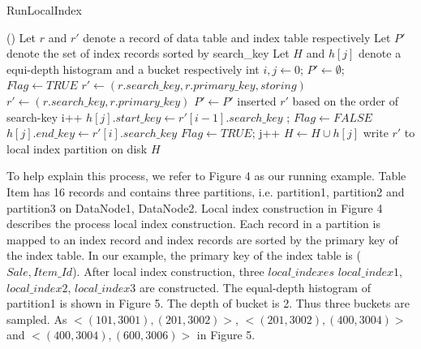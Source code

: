 \LinesNumbered
\vspace{-0.5cm}
\begin{algorithm}[htb]
	\SetAlgoLined
	\caption{RunLocalIndex}%
	\Fn(){}{	
		Let $r$ and $r'$  denote a record of data table and index table respectively \;
		Let $P'$ denote the set of index records sorted by search\_key \;
		Let $H$ and $h[j]$ denote a equi-depth histogram and a bucket respectively \;
		int $i, j\leftarrow 0$; $P' \leftarrow \emptyset$; $Flag \leftarrow TRUE$ \;
		{
			{
				$r' \leftarrow (r.search\_key, r.primary\_key, storing ) $ \;
			}
			\Else
			{
				$r' \leftarrow (r.search\_key, r.primary\_key)$\;
			}
			$P' \leftarrow  P'$ inserted $r'$ based on the order of search-key   \;
		}
		{
			i++ \;
			{
				$h[j].start\_key \leftarrow r'[i-1].search\_key$ ; $Flag \leftarrow FALSE$  \;
			}
			{
				$h[j].end\_key \leftarrow r'[i].search\_key$ \;
				$Flag \leftarrow TRUE$;  j++\;
				$H \leftarrow H \cup h[j]$ \;
			}
			write $r'$ to local index partition on disk \;
		}
		\Return$H$
	}
\end{algorithm}
\vspace{-0.5cm}

\begin{example}
To help explain this process, we refer to Figure 4 as our running example. Table Item has 16 records and contains three partitions, i.e. partition1, partition2 and partition3 on DataNode1, DataNode2.
Local index construction in Figure 4 describes the process local index construction. Each record in a partition is mapped to an index record and index records are sorted by the primary key of the index table. In our example, the primary key of the index table is ($Sale,Item\_Id$). After local index construction, three $local\_indexes$ $local\_index1$, $local\_index2$, $local\_index3$ are constructed.  The equal-depth histogram of partition1 is shown in Figure 5. The depth of bucket is 2. Thus three buckets are sampled. As $<(101,3001),(201,3002)>$, $<(201,3002),(400,3004)>$ and $<(400,3004),(600,3006)>$ in Figure 5. %
\end{example}

